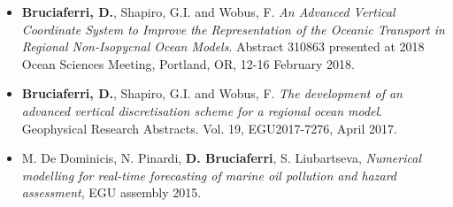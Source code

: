 \documentclass[a4paper, oneside, final]{scrartcl}
\begin{document}
\begin{itemize}
\item \textbf{Bruciaferri, D.}, Shapiro, G.I. and Wobus, F. \textit{An Advanced Vertical Coordinate System to Improve the Representation of the Oceanic Transport in Regional Non-Isopycnal Ocean Models}. Abstract 310863 presented at 2018 Ocean Sciences Meeting, Portland, OR, 12-16 February 2018.
\item \textbf{Bruciaferri, D.}, Shapiro, G.I. and Wobus, F. \textit{The development of an advanced vertical discretisation scheme for a regional ocean model}. Geophysical Research Abstracts. Vol. 19, EGU2017-7276, April 2017.
\item M. De Dominicis, N. Pinardi, \textbf{D. Bruciaferri}, S. Liubartseva, \textit{Numerical modelling for real-time forecasting of marine oil pollution and hazard assessment}, EGU assembly 2015.
\end{itemize}
\end{document}
